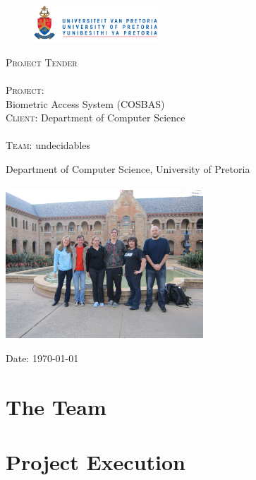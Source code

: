 \documentclass[12pt]{article}
\begin{document}
\begin{titlepage}
	\begin{center}
		
		\begin{figure}[t]
			\centering
			\includegraphics[width=175px]{UP_Logo.png}
		\end{figure}
		
		\textsc{\Huge Project Tender} \\ 

		\textsc{\huge \\Project:\\	}
		\huge Biometric Access System (COSBAS) 
		\textsc{\Large \\Client:}
		\large Department of Computer Science \\

		\textsc{\huge \\ Team:}
		\huge \textsc{}undecidables\textsc{}
		
		\small Department of Computer Science, University of Pretoria \\ 
		\hfill \\
		\includegraphics[width=280px]{Team.JPG}\\

	\vfill

	{\large Date: \today}		
		
		
	\end{center}
\end{titlepage}

\pagebreak
\tableofcontents

\pagebreak

\section{The Team}


\pagebreak
\section{Project Execution}

\end{document}
